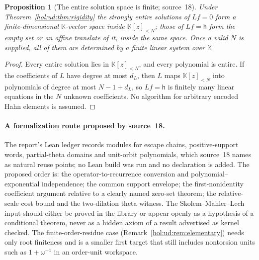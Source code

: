 \documentclass[11pt]{article}
\numberwithin{equation}{section}
\newtheorem{proposition}[theorem]{Proposition}
\theoremstyle{definition}
\theoremstyle{remark}
\newcommand{\KK}{\mathbb K}
\begin{document}
\begin{proposition}[The entire solution space is finite; source~18]
\label{hol:ud:prop:finitespace}
Under Theorem~\ref{hol:ud:thm:rigidity} the strongly entire solutions of $Lf=0$
form a finite-dimensional $\KK$-vector space inside $\KK[z]_{<N}$; those of
$Lf=\mathsf h$ form the empty set or an affine translate of it, inside the
same space. Once a valid $N$ is supplied, all of them are determined by a
finite linear system over $\KK$.
\end{proposition}

\begin{proof}
Every entire solution lies in $\KK[z]_{<N}$, and every polynomial is entire.
If the coefficients of $L$ have degree at most $d_L$, then $L$ maps
$\KK[z]_{<N}$ into polynomials of degree at most $N-1+d_L$, so $Lf=\mathsf h$ is
finitely many linear equations in the $N$ unknown coefficients. No algorithm
for arbitrary encoded Hahn elements is assumed.
\end{proof}

\paragraph{A formalization route proposed by source~18.}
The report's Lean ledger records modules for escape chains, positive-support
words, partial-theta domains and unit-orbit polynomials, which source~18
names as natural reuse points; no Lean build was run and no declaration is
added. The proposed order is: the operator-to-recurrence conversion and
polynomial--exponential independence; the common support envelope; the
first-nonidentity coefficient argument relative to a clearly named zero-set
theorem; the relative-scale cost bound and the two-dilation theta witness.
The Skolem--Mahler--Lech input should either be proved in the library or
appear openly as a hypothesis of a conditional theorem, never as a hidden
axiom of a result advertised as kernel checked. The finite-order-residue case
(Remark~\ref{hol:ud:rem:elementary}) needs only root finiteness and is a
smaller first target that still includes nontorsion units such as
$1+\omega^{-1}$ in an order-unit workspace.
\end{document}
